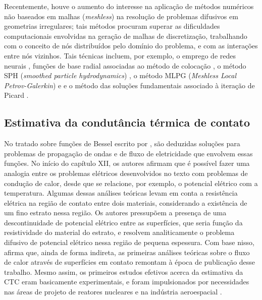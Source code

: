 Recentemente, houve o aumento do interesse na aplicação de métodos numéricos não baseados em malhas (\textit{meshless}) na resolução
de problemas difusivos em geometrias irregulares; tais métodos procuram superar as dificuldades computacionais envolvidas na geração
de malhas de discretização, trabalhando com o conceito de nós distribuídos pelo domínio do problema, e com as interações entre nós
vizinhos. Tais técnicas incluem, por exemplo, o emprego de redes neurais \citep{artigo_deng, artigo_heidari}, funções de base
radial associadas ao método de colocação \citep{artigo_chen, artigo_dai}, o método SPH (\textit{smoothed particle hydrodynamics}) \citep{artigo_vishwakarma}, o método MLPG (\textit{Meshless Local Petrov-Galerkin})
\citep{artigo_li} e e o método das soluções fundamentais associado à iteração de Picard \citep{artigo_alves_2}.

\subsection{Estimativa da condutância térmica de contato}

No tratado sobre funções de Bessel escrito por \cite{livro_bessel}, são deduzidas soluções para problemas de propagação de ondas e de fluxo de
eletricidade que envolvem essas funções. No início do capítulo XII, os autores afirmam que é possível fazer uma analogia entre os problemas
elétricos desenvolvidos no texto com problemas de condução de calor, desde que se relacione, por exemplo, o potencial elétrico com a temperatura. Algumas
dessas análises teóricas levam em conta a resistência elétrica na região de contato entre dois materiais, considerando a existência de um fino
estrato nessa região. Os autores pressupõem a presença de uma descontinuidade de potencial elétrico entre as superfícies,
que seria função da resistividade do material do estrato, e resolvem analiticamente o problema difusivo de potencial elétrico nessa região de pequena espessura. 
Com base nisso, \cite{tese_mikic} afirma que, ainda de forma indireta, as primeiras análises teóricas sobre o fluxo de calor através de superfícies
em contato remontam à época de publicação desse trabalho. Mesmo assim, os primeiros estudos efetivos acerca da estimativa da CTC eram basicamente experimentais,
e foram impulsionados por necessidades nas áreas de projeto de reatores nucleares e na indústria aeroespacial \citep{tese_mikic}.

